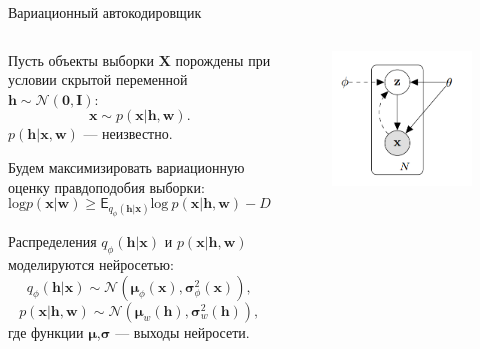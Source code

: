 \documentclass[usenames,dvipsnames,10pt,pdf,utf8,russian,aspectratio=43]{beamer}
\begin{document}
\begin{frame}{Вариационный автокодировщик}
\begin{columns}[T]
\begin{column}{.65\textwidth}
Пусть объекты выборки $\mathbf{X}$ порождены при условии скрытой переменной $\mathbf{h} \sim \mathcal{N}(\mathbf{0}, \mathbf{I})$:
$$
\mathbf{x} \sim p(\mathbf{x}|\mathbf{h}, \mathbf{w}).
$$
$p(\mathbf{h}|\mathbf{x}, \mathbf{w})$ --- неизвестно.

Будем максимизировать вариационную оценку правдоподобия выборки:
$$
\text{log}p(\mathbf{x}|\mathbf{w}) \geq \mathsf{E}_{q_\phi(\mathbf{h}|\mathbf{x})}\text{log}~p(\mathbf{x}|\mathbf{h}, \mathbf{w}) - D_\text{KL}(q_\phi(\mathbf{h}|\mathbf{x})||p(\mathbf{h})) \to \max.
$$

Распределения $q_\phi(\mathbf{h}|\mathbf{x})$ и $p(\mathbf{x}|\mathbf{h}, \mathbf{w})$ моделируются нейросетью:
$$
q_\phi(\mathbf{h}|\mathbf{x}) \sim \mathcal{N}(\boldsymbol{\mu}_\phi(\mathbf{x}),\boldsymbol{\sigma}_\phi^2(\mathbf{x})), 
$$
$$
p(\mathbf{x}|\mathbf{h}, \mathbf{w}) \sim \mathcal{N}(\boldsymbol{\mu}_w(\mathbf{h}),\boldsymbol{\sigma}_w^2(\mathbf{h})),
$$
где функции $\boldsymbol{\mu}$,$\boldsymbol{\sigma}$ --- выходы нейросети.\\
\end{column}%
\hfill%
\begin{column}{.25\textwidth}
\begin{figure}
  \centering
\includegraphics[width=\textwidth]{graph.png}
\end{figure}
\end{column}
\end{columns}
\end{frame}
\end{document}
